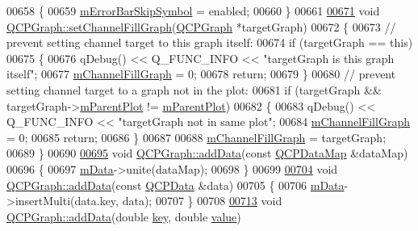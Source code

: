 \begin{DoxyCode}
00658 \{
00659   \hyperlink{a00031_acf631d7dbd1055a69ab3b63094868557}{mErrorBarSkipSymbol} = enabled;
00660 \}
00661 
\hypertarget{a00115_source_l00671}{}\hyperlink{a00031_a2d03156df1b64037a2e36cfa50351ca3}{00671} \textcolor{keywordtype}{void} \hyperlink{a00031_a2d03156df1b64037a2e36cfa50351ca3}{QCPGraph::setChannelFillGraph}(\hyperlink{a00031}{QCPGraph} *targetGraph)
00672 \{
00673   \textcolor{comment}{// prevent setting channel target to this graph itself:}
00674   \textcolor{keywordflow}{if} (targetGraph == \textcolor{keyword}{this})
00675   \{
00676     qDebug() << Q\_FUNC\_INFO << \textcolor{stringliteral}{"targetGraph is this graph itself"};
00677     \hyperlink{a00031_aa49af2f241d9ffdc301a24f08b10bdc8}{mChannelFillGraph} = 0;
00678     \textcolor{keywordflow}{return};
00679   \}
00680   \textcolor{comment}{// prevent setting channel target to a graph not in the plot:}
00681   \textcolor{keywordflow}{if} (targetGraph && targetGraph->\hyperlink{a00044_aa2a528433e44db02b8aef23c1f9f90ed}{mParentPlot} != \hyperlink{a00044_aa2a528433e44db02b8aef23c1f9f90ed}{mParentPlot})
00682   \{
00683     qDebug() << Q\_FUNC\_INFO << \textcolor{stringliteral}{"targetGraph not in same plot"};
00684     \hyperlink{a00031_aa49af2f241d9ffdc301a24f08b10bdc8}{mChannelFillGraph} = 0;
00685     \textcolor{keywordflow}{return};
00686   \}
00687   
00688   \hyperlink{a00031_aa49af2f241d9ffdc301a24f08b10bdc8}{mChannelFillGraph} = targetGraph;
00689 \}
00690 
\hypertarget{a00115_source_l00695}{}\hyperlink{a00031_aa5c6181d84db72ce4dbe9dc15a34ef4f}{00695} \textcolor{keywordtype}{void} \hyperlink{a00031_aa5c6181d84db72ce4dbe9dc15a34ef4f}{QCPGraph::addData}(\textcolor{keyword}{const} \hyperlink{a00116_a84a9c4a4c2216ccfdcb5f3067cda76e3}{QCPDataMap} &dataMap)
00696 \{
00697   \hyperlink{a00031_a8457c840f69a0ac49f61d30a509c5d08}{mData}->unite(dataMap);
00698 \}
00699 
\hypertarget{a00115_source_l00704}{}\hyperlink{a00031_a80cc91e1e0ef77eb50afc5b366d0efd9}{00704} \textcolor{keywordtype}{void} \hyperlink{a00031_aa5c6181d84db72ce4dbe9dc15a34ef4f}{QCPGraph::addData}(\textcolor{keyword}{const} \hyperlink{a00030_d2/d94/a00184}{QCPData} &data)
00705 \{
00706   \hyperlink{a00031_a8457c840f69a0ac49f61d30a509c5d08}{mData}->insertMulti(data.key, data);
00707 \}
00708 
\hypertarget{a00115_source_l00713}{}\hyperlink{a00031_a0bf98b1972286cfb7b1c4b7dd6ae2012}{00713} \textcolor{keywordtype}{void} \hyperlink{a00031_aa5c6181d84db72ce4dbe9dc15a34ef4f}{QCPGraph::addData}(\textcolor{keywordtype}{double} \hyperlink{a00116_a94bb892c30911cd62cba0707a5395be4}{key}, \textcolor{keywordtype}{double} \hyperlink{a00116_aee90379adb0307effb138f4871edbc5c}{value})

\end{DoxyCode}
